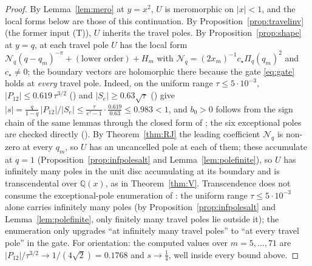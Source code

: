 \documentclass[11pt]{article}
\theoremstyle{plain}
\theoremstyle{definition}
\theoremstyle{remark}
\newcommand{\Q}{\mathbb{Q}}
\theoremstyle{plain}\newtheorem*{maintheorem}{Main Theorem}
\begin{document}
\begin{proof}
By Lemma~\ref{lem:mero} at $y=x^2$, $U$ is meromorphic on $|x|<1$, and the local forms below are
those of this continuation. By Proposition~\ref{prop:travelinv} (the former input \textup{(T)}), $U$ inherits the travel poles. By Proposition~\ref{prop:shape} at $y=q$, at each
travel pole $U$ has the local form $\mathcal N_q(q-q_m)^{-\pi}+(\text{lower order})+H_m$ with
$\mathcal N_q=(2x_m)^{-1}c_\star\Pi_q(q_m)^2$ and $c_\star\ne0$; the boundary vectors are holomorphic there
because the gate \eqref{eq:gate} holds at \emph{every} travel pole. Indeed, on the uniform range
$\tau\le5\cdot10^{-3}$, $|P_{12}|\le0.619\,\tau^{3/2}$ ({\cite[Theorem ``the amplitude estimate $(\star)$'', \textup{thm:star}]{Bonfioli2026bB}}) and
$|S_e|\ge0.63\sqrt\tau$ ({\cite[Lemma ``the denominator at the pole'', \textup{app:Se}]{Bonfioli2026bB}}) give
$|s|=\tfrac{q}{1-q}\,|P_{12}|/|S_e|\le\tfrac{\tau}{e^\tau-1}\cdot\tfrac{0.619}{0.63}\le0.983<1$,
and $b_0>0$ follows from the sign chain of the same lemmas through the closed form of
{\cite[Corollary ``the dictionary'', \textup{cor:dict}]{Bonfioli2026bB}}; the six exceptional poles are checked directly
({\cite[Corollary ``the gate closes'', \textup{app:gate}]{Bonfioli2026bB}}). By Theorem~\ref{thm:RJ} the leading coefficient $\mathcal N_q$ is
non-zero at every $q_m$, so $U$ has an uncancelled pole at each of them; these accumulate at
$q=1$ (Proposition~\ref{prop:infpolesalt} and Lemma~\ref{lem:polefinite}), so $U$ has infinitely many poles in
the unit disc accumulating at its boundary and is transcendental over $\Q(x)$, as in
Theorem~\ref{thm:V}. Transcendence does not consume the exceptional-pole enumeration of
{\cite[Theorem ``the amplitude estimate $(\star)$'', \textup{thm:star}]{Bonfioli2026bB}}: the uniform range $\tau\le5\cdot10^{-3}$ alone carries infinitely many
poles (by Proposition~\ref{prop:infpolesalt} and Lemma~\ref{lem:polefinite}, only
finitely many travel poles lie outside it); the enumeration only upgrades
``at infinitely many travel poles'' to ``at every travel pole'' in the gate. For orientation: the
computed values over $m=5,\dots,71$ are $|P_{12}|/\tau^{3/2}\to1/(4\sqrt2)=0.1768$ and
$s\to\tfrac14$, well inside every bound above.
\end{proof}
\end{document}
